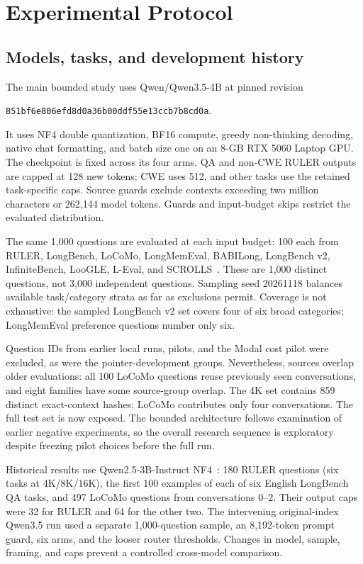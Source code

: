 \documentclass[runningheads]{llncs}
\begin{document}
\section{Experimental Protocol}
\subsection{Models, tasks, and development history}
The main bounded study uses Qwen/Qwen3.5-4B at pinned revision
\begin{center}\small\texttt{851bf6e806efd8d0a36b00ddf55e13ccb7b8cd0a}.\end{center}
It uses NF4 double quantization, BF16 compute, greedy non-thinking decoding, native chat formatting, and batch size one on an 8-GB RTX 5060 Laptop GPU. The checkpoint is fixed across its four arms. QA and non-CWE RULER outputs are capped at 128 new tokens; CWE uses 512, and other tasks use the retained task-specific caps. Source guards exclude contexts exceeding two million characters or 262,144 model tokens. Guards and input-budget skips restrict the evaluated distribution.

The same 1,000 questions are evaluated at each input budget: 100 each from RULER, LongBench, LoCoMo, LongMemEval, BABILong, LongBench v2, InfiniteBench, LooGLE, L-Eval, and SCROLLS~\cite{hsieh2024ruler,bai2024longbench,maharana2024locomo,wu2024longmemeval,kuratov2024babilong,bai2024longbenchv2,zhang2024infinitebench,li2024loogle,an2024leval,shaham2022scrolls}. These are 1,000 distinct questions, not 3,000 independent questions. Sampling seed 20261118 balances available task/category strata as far as exclusions permit. Coverage is not exhaustive: the sampled LongBench v2 set covers four of six broad categories; LongMemEval preference questions number only six.

Question IDs from earlier local runs, pilots, and the Modal cost pilot were excluded, as were the pointer-development groups. Nevertheless, sources overlap older evaluations: all 100 LoCoMo questions reuse previously seen conversations, and eight families have some source-group overlap. The 4K set contains 859 distinct exact-context hashes; LoCoMo contributes only four conversations. The full test set is now exposed. The bounded architecture follows examination of earlier negative experiments, so the overall research sequence is exploratory despite freezing pilot choices before the full run.

Historical results use Qwen2.5-3B-Instruct NF4~\cite{qwen2025qwen25,dettmers2023qlora}: 180 RULER questions (six tasks at 4K/8K/16K), the first 100 examples of each of six English LongBench QA tasks, and 497 LoCoMo questions from conversations 0--2. Their output caps were 32 for RULER and 64 for the other two. The intervening original-index Qwen3.5 run used a separate 1,000-question sample, an 8,192-token prompt guard, six arms, and the looser router thresholds. Changes in model, sample, framing, and caps prevent a controlled cross-model comparison.
\end{document}
